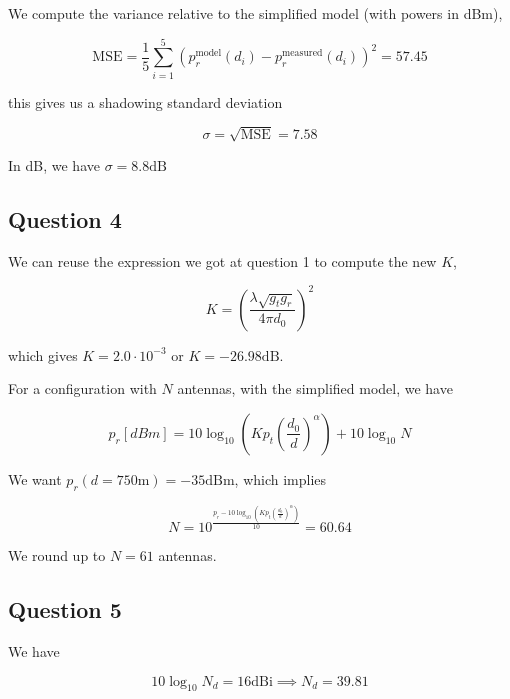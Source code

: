 \documentclass[]{article}
\begin{document}
	We compute the variance relative to the simplified model (with powers in dBm),
	
	\begin{equation}
		 \mathrm{MSE} = \frac{1}{5}\sum_{i=1}^{5} \left(p_r^{\mathrm{model}}(d_i) - p_r^{\mathrm{measured}}(d_i)\right)^2 = 57.45
	\end{equation}
	
	this gives us a shadowing standard deviation
	
	\begin{equation}
		\sigma = \sqrt{\mathrm{MSE}} = 7.58
	\end{equation}
	
	In dB, we have $\sigma = 8.8 \mathrm{dB}$
	
	\subsection*{Question 4}
	
	We can reuse the expression we got at question 1 to compute the new $K$,
	
	\begin{equation}
		K = \left(\frac{\lambda \sqrt{g_t g_r}}{4 \pi d_0}\right)^2
	\end{equation}
	
	which gives $K = 2.0 \cdot 10^{-3}$ or $K = -26.98 \mathrm{dB}$.
	
	For a configuration with $N$ antennas, with the simplified model, we have 
	
	\begin{equation}
		p_r[dBm] = 10\log_{10}\left(K p_t \left(\frac{d_0}{d}\right)^\alpha \right) + 10\log_{10} N
	\end{equation}
	
	We want $p_r(d=750\mathrm{m}) = -35 \mathrm{dBm}$, which implies
	
	\begin{equation}
		N = 10^{\frac{p_r - 10\log_{10}\left(K p_t \left(\frac{d_0}{d}\right)^\alpha \right)}{10}} = 60.64
	\end{equation}
	
	We round up to $N = 61$ antennas.
	
	\subsection*{Question 5}
	
	We have
	
	\begin{equation}
		10 \log_{10} N_d = 16 \mathrm{dBi} \implies N_d = 39.81
	\end{equation}
	
\end{document}
